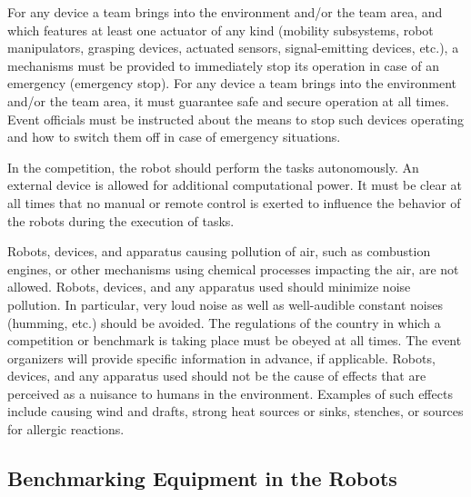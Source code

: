 \begin{robotConstraint}
	For any device a team brings into the environment and/or the team area, and which features at least one actuator of any kind (mobility subsystems, robot manipulators, grasping devices, actuated sensors, signal-emitting devices, etc.), a mechanisms must be provided to immediately stop its operation in case of an emergency (emergency stop). 
	For any device a team brings into the environment and/or the team area, it must guarantee safe and secure operation at all times. 
	Event officials must be instructed about the means to stop such devices operating and how to switch them off in case of emergency situations. 
\end{robotConstraint}

\begin{robotConstraint}[Operation]
In the competition, the robot should perform the tasks autonomously.
An external device is allowed for additional computational power.
It must be clear at all times that no manual or remote control is exerted to influence the behavior of the robots during the execution of tasks.
\end{robotConstraint}


\begin{robotConstraint}
  Robots, devices, and apparatus causing pollution of air, such as combustion engines, or other mechanisms using chemical processes impacting the air, are not allowed.
  Robots, devices, and any apparatus used should minimize noise pollution. In particular, very loud noise as well as well-audible constant noises (humming, etc.) should be avoided. The regulations of the country in which a competition or benchmark is taking place must be obeyed at all times. The event organizers will provide specific information in advance, if applicable. Robots, devices, and any apparatus used should not be the cause of effects that are perceived as a nuisance to humans in the environment. Examples of such effects include causing wind and drafts, strong heat sources or sinks, stenches, or sources for allergic reactions. 
\end{robotConstraint}


\subsection{Benchmarking Equipment in the Robots}
\label{ssec:RobotBenchEquip}

